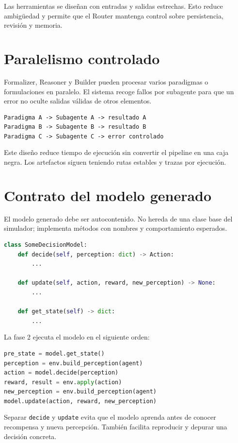 Las herramientas se diseñan con entradas y salidas estrechas. Esto reduce
ambigüedad y permite que el Router mantenga control sobre persistencia,
revisión y memoria.

\section{Paralelismo controlado}

Formalizer, Reasoner y Builder pueden procesar varios paradigmas o
formulaciones en paralelo. El sistema recoge fallos por subagente para que un
error no oculte salidas válidas de otros elementos.

\begin{verbatim}
Paradigma A -> Subagente A -> resultado A
Paradigma B -> Subagente B -> resultado B
Paradigma C -> Subagente C -> error controlado
\end{verbatim}

Este diseño reduce tiempo de ejecución sin convertir el pipeline en una caja
negra. Los artefactos siguen teniendo rutas estables y trazas por ejecución.

\section{Contrato del modelo generado}

El modelo generado debe ser autocontenido. No hereda de una clase base del
simulador; implementa métodos con nombres y comportamiento esperados.

\begin{lstlisting}[language=Python]
class SomeDecisionModel:
    def decide(self, perception: dict) -> Action:
        ...

    def update(self, action, reward, new_perception) -> None:
        ...

    def get_state(self) -> dict:
        ...
\end{lstlisting}

La fase 2 ejecuta el modelo en el siguiente orden:

\begin{lstlisting}[language=Python]
pre_state = model.get_state()
perception = env.build_perception(agent)
action = model.decide(perception)
reward, result = env.apply(action)
new_perception = env.build_perception(agent)
model.update(action, reward, new_perception)
\end{lstlisting}

Separar \texttt{decide} y \texttt{update} evita que el modelo aprenda antes de
conocer recompensa y nueva percepción. También facilita reproducir y depurar una
decisión concreta.

